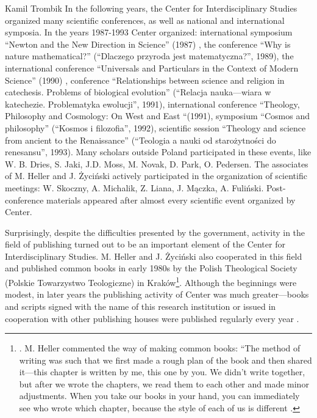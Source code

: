 \begin{artengenv}{Kamil Trombik}
In the following years, the Center for Interdisciplinary Studies organized many scientific conferences, as well as
national and international symposia. In the years 1987-1993 Center organized: international symposium ``Newton and the
New Direction in Science'' (1987) , the conference ``Why is nature mathematical?'' (``Dlaczego przyroda jest
matematyczna?'', 1989), the international conference ``Universals and Particulars in the Context of Modern Science''
(1990) , conference ``Relationships between science and religion in catechesis. Problems of biological evolution''
(``Relacja nauka---wiara w katechezie. Problematyka ewolucji'', 1991), international conference ``Theology, Philosophy and
Cosmology: On West and East ``(1991), symposium ``Cosmos and philosophy'' (``Kosmos i filozofia'', 1992), scientific session
``Theology and science from ancient to the Renaissance'' (``Teologia a nauki od starożytności do renesansu'', 1993). Many
scholars outside Poland participated in these events, like W. B. Dries, S. Jaki, J.D. Moss, M. Novak, D. Park, O.
Pedersen. The associates of M. Heller and J. Życiński actively participated in the organization of scientific meetings:
W. Skoczny, A. Michalik, Z. Liana, J. Mączka, A. Fuliński. Post-conference materials appeared after almost every
scientific event organized by Center.

Surprisingly, despite the difficulties presented by the government, activity in the field of publishing turned out to be
an important element of the Center for Interdisciplinary Studies. M. Heller and J. Życiński also cooperated in this
field and published common books in early 1980s by the Polish Theological Society (Polskie Towarzystwo Teologiczne) in
Kraków\footnote{\parencites{heller_wszechswiat_1980,heller_drogi_1983}.
	M. Heller commented the way of making
common books: ``The method of writing was such that we first made a rough plan of the book and then shared it---this
chapter is written by me, this one by you. We didn't write together, but after we wrote the chapters, we read them to
each other and made minor adjustments. When you take our books in your hand, you can immediately see who wrote which
chapter, because the style of each of us is different
\parencite[p.231]{heller_wierze_2016}.
}. Although
the beginnings were modest, in later years the publishing activity of Center was much greater---books and scripts signed
with the name of this research institution or issued in cooperation with other publishing houses were published
regularly every year
\parencite[e.g.][]{heller_filozofowac_1987,coyne_newton_1988,heller_matematycznosc_1990,%
	mcmullin_ewolucja_1990,heller_spor_1991,wolak_neotomizm_1993}.


\end{artengenv}
